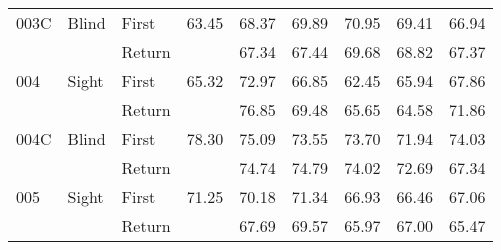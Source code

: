 \begin{table}[!htb]
\begin{tabular}{lllrrrrrr}
003C & Blind & First &    63.45 &  68.37 &  69.89 &                                                 70.95 &                                                  69.41 &   66.94 \\
    &       & Return &          &  67.34 &  67.44 &                                                 69.68 &                                                  68.82 &   67.37 \\
004 & Sight & First &    65.32 &  72.97 &  66.85 &                                                 62.45 &                                                  65.94 &   67.86 \\
    &       & Return &          &  76.85 &  69.48 &                                                 65.65 &                                                  64.58 &   71.86 \\
004C & Blind & First &    78.30 &  75.09 &  73.55 &                                                 73.70 &                                                  71.94 &   74.03 \\
    &       & Return &          &  74.74 &  74.79 &                                                 74.02 &                                                  72.69 &   67.34 \\
005 & Sight & First &    71.25 &  70.18 &  71.34 &                                                 66.93 &                                                  66.46 &   67.06 \\
    &       & Return &          &  67.69 &  69.57 &                                                 65.97 &                                                  67.00 &   65.47 \\
\bottomrule
\end{tabular}
\end{table}

